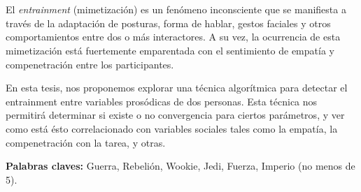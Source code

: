 \chapter*{\runtitulo}

\noindent El \emph{entrainment} (mimetización) es un fenómeno inconsciente que se manifiesta a través de la adaptación de posturas, forma de hablar, gestos faciales y otros comportamientos entre dos o más interactores. A su vez, la ocurrencia de esta mimetización está fuertemente emparentada con el sentimiento de empatía y compenetración entre los participantes.

En esta tesis, nos proponemos explorar una técnica algorítmica para detectar el entrainment entre variables prosódicas de dos personas. Esta técnica nos permitirá determinar si existe o no convergencia para ciertos parámetros, y ver como está ésto correlacionado con variables sociales tales como la empatía, la compenetración con la tarea, y otras.

\bigskip

\noindent\textbf{Palabras claves:} Guerra, Rebelión, Wookie, Jedi, Fuerza, Imperio (no menos de 5).
